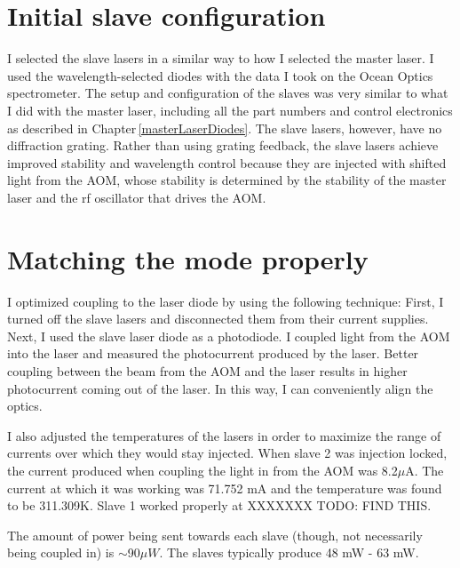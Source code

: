 \section{Initial slave configuration}
\label{initialSlaveConfiguration}


I selected the slave lasers in a similar way to how I selected the master laser. I used the wavelength-selected diodes with the data I took on the Ocean Optics spectrometer. The setup and configuration of the slaves was very similar to what I did with the master laser, including all the part numbers and control electronics as described in Chapter\,\ref{masterLaserDiodes}. The slave lasers, however, have no diffraction grating. Rather than using grating feedback, the slave lasers achieve improved stability and wavelength control because they are injected with shifted light from the AOM, whose stability is determined by the stability of the master laser and the rf oscillator that drives the AOM. 




\section{Matching the mode properly}
I optimized coupling to the laser diode by using the following technique: First, I turned off the slave lasers and disconnected them from their current supplies. Next, I used the slave laser diode as a photodiode. I coupled light from the AOM into the laser and measured the photocurrent produced by the laser. Better coupling between the beam from the AOM and the laser results in higher photocurrent coming out of the laser. In this way, I can conveniently align the optics. 

I also adjusted the temperatures of the lasers in order to maximize the range of currents over which they would stay injected. 
When slave 2 was injection locked, the current produced when coupling the light in from the AOM was 8.2$\mu$A. The current at which it was working was 71.752 mA %
and the temperature was found to be 311.309K. %
Slave 1 worked properly at XXXXXXX TODO: FIND THIS.

The amount of power being sent towards each slave (though, not necessarily being coupled in) is $\sim$90$\mu W$. The slaves typically produce 48 mW - 63 mW.




